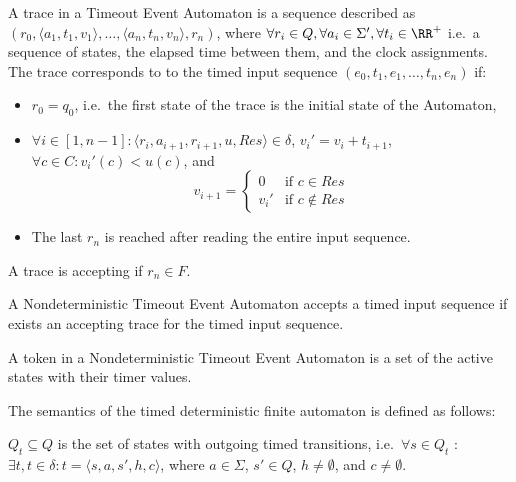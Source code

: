 				\begin{dfn}
				\label{dfn:cep:tea:trace}
				A trace in a Timeout Event Automaton is a sequence described as
				$(r_0, \langle a_1, t_1, v_1\rangle, \dots, \langle a_n, t_n, v_n \rangle, r_n)$, where $\forall r_i \in Q, \forall a_i \in \Sigma', \forall t_i \in \RR^+$ i.e.~a sequence of states, the elapsed time between them, and the clock assignments. The trace corresponds to to the timed input sequence $(e_0, t_1, e_1, \dots, t_n, e_n)$ if:
				\begin{itemize}
					\item $r_0 = q_0$, i.e.~the first state of the trace is the initial state of the Automaton,
					\item $\forall i \in [1,n - 1] \colon \langle r_i, a_{i+1}, r_{i+1}, u, \mathit{Res} \rangle \in \delta$,
						${v_i}' = v_i + t_{i+1}$, $\forall c \in C \colon {v_i}'(c) < u(c)$, and
						$$v_{i+1} = \begin{cases}
										0      & \text{if\ } c \in    \mathit{Res} \\
										{v_i}' & \text{if\ } c \notin \mathit{Res}
									\end{cases}$$
					\item The last $r_n$ is reached after reading the entire input sequence.	
				\end{itemize}
				A trace is accepting if $r_n \in F$.
				\end{dfn}
				
				\begin{dfn}
					\label{dfn:cep:tea:accepting}
					A Nondeterministic Timeout Event Automaton accepts a timed input sequence if exists an accepting trace for the timed input sequence.
				\end{dfn}
				
				\begin{dfn}
					\label{dfn:cep:tea:token}
					A token in a Nondeterministic Timeout Event Automaton is a set of the active states with their timer values.
				\end{dfn}
				
				The semantics of the timed deterministic finite automaton is defined as follows:
				
				
				$Q_t \subseteq Q$ is the set of states with outgoing timed transitions, 
				i.e.~$\forall s \in Q_t$ : $ \exists t, t \in \delta \colon t = \langle s, a, s', h, c \rangle$, where $a \in \Sigma$, $s' \in Q$, $h \neq \emptyset$, and $c \neq \emptyset$.
				
